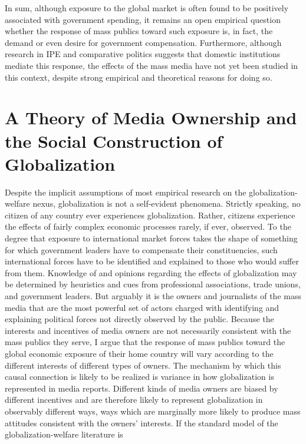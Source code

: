 \documentclass[12pt]{report}
\begin{document}
	In sum, although exposure to the global market is often found to be positively associated with government spending, it remains an open empirical question whether the response of mass publics toward such exposure is, in fact, the demand or even desire for government compensation. Furthermore, although research in IPE and comparative politics suggests that domestic institutions mediate this response, the effects of the mass media have not yet been studied in this context, despite strong empirical and theoretical reasons for doing so.

\section{A Theory of Media Ownership and the Social Construction of Globalization}

	Despite the implicit assumptions of most empirical research on the globalization-welfare nexus, globalization is not a self-evident phenomena. Strictly speaking, no citizen of any country ever experiences globalization. Rather, citizens experience the effects of fairly complex economic processes rarely, if ever, observed. To the degree that exposure to international market forces takes the shape of something for which government leaders have to compensate their constituencies, such international forces have to be identified and explained to those who would suffer from them. Knowledge of and opinions regarding the effects of globalization may be determined by heuristics and cues from professional associations, trade unions, and government leaders. But arguably it is the owners and journalists of the mass media that are the most powerful set of actors charged with identifying and explaining political forces not directly observed by the public. Because the interests and incentives of media owners are not necessarily consistent with the mass publics they serve, I argue that the response of mass publics toward the global economic exposure of their home country will vary according to the different interests of different types of owners. The mechanism by which this causal connection is likely to be realized is variance in how globalization is represented in media reports.
	Different kinds of media owners are biased by different incentives and are therefore likely to represent globalization in observably different ways, ways which are marginally more likely to produce mass attitudes consistent with the owners' interests. If the standard model of the globalization-welfare literature is 
\end{document}
